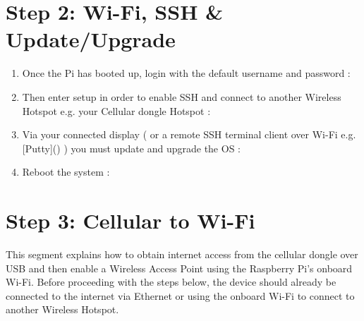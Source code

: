 \documentclass[letterpaper,10pt,openany,oneside,english]{sphinxmanual}
\begin{document}
\section{Step 2: Wi-Fi, SSH \& Update/Upgrade}
\label{\detokenize{manual_build:step-2-wi-fi-ssh-update-upgrade}}\begin{enumerate}
\item {} 
Once the Pi has booted up, login with the default username and password :
\begin{quote}


\end{quote}

\item {} 
Then enter setup in order to enable SSH and connect to another Wireless Hotspot e.g. your Cellular dongle Hotspot :
\begin{quote}

\end{quote}

\item {} 
Via your connected display ( or a remote SSH terminal client over Wi-Fi e.g. {[}Putty{]}() ) you must update and upgrade the OS :
\begin{quote}

\end{quote}

\item {} 
Reboot the system :
\begin{quote}

\end{quote}

\end{enumerate}


\section{Step 3: Cellular to Wi-Fi}
\label{\detokenize{manual_build:step-3-cellular-to-wi-fi}}
This segment explains how to obtain internet access from the cellular dongle over USB and then enable a Wireless Access Point using the Raspberry Pi’s onboard Wi-Fi.
Before proceeding with the steps below, the device should already be connected to the internet via Ethernet or using the onboard Wi-Fi to connect to another Wireless Hotspot.
\end{document}

